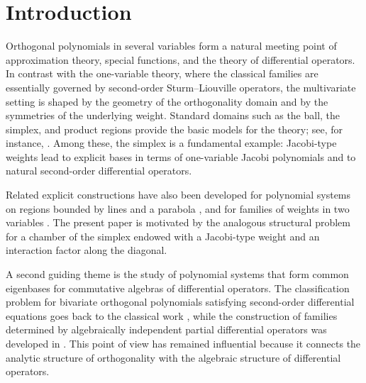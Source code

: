 \documentclass[reqno,10pt]{amsart}
\theoremstyle{plain}
\numberwithin{equation}{section}
\numberwithin{figure}{section}
\begin{document}


\maketitle

\section{Introduction}

Orthogonal polynomials in several variables form a natural meeting point of
approximation theory, special functions, and the theory of differential
operators. In contrast with the one-variable theory, where the classical
families are essentially governed by second-order Sturm--Liouville operators,
the multivariate setting is shaped by the geometry of the orthogonality domain
and by the symmetries of the underlying weight. Standard domains such as the
ball, the simplex, and product regions provide the basic models for the
theory; see, for instance, \cite{DX14}. Among these, the simplex is a
fundamental example: Jacobi-type weights lead to explicit bases in terms of
one-variable Jacobi polynomials and to natural second-order differential
operators.

Related explicit constructions have also been developed for polynomial
systems on regions bounded by lines and a parabola
\cite{Koornwinder1975,SprinkhuizenKuyper76}, and for families of weights in
two variables \cite{Xu11}. The present paper is motivated by the analogous
structural problem for a chamber of the simplex endowed with a Jacobi-type
weight and an interaction factor along the diagonal.


A second guiding theme is the study of polynomial systems that form common
eigenbases for commutative algebras of differential operators. The classification problem for bivariate orthogonal polynomials
satisfying second-order differential equations goes back to the classical
work \cite{KrallSheffer67}, while the construction of families determined by
algebraically independent partial differential operators was developed in
\cite{Ko74_I,Ko74_II}. This point of view has remained influential because it
connects the analytic structure of orthogonality with the algebraic structure
of differential operators.
\end{document}
